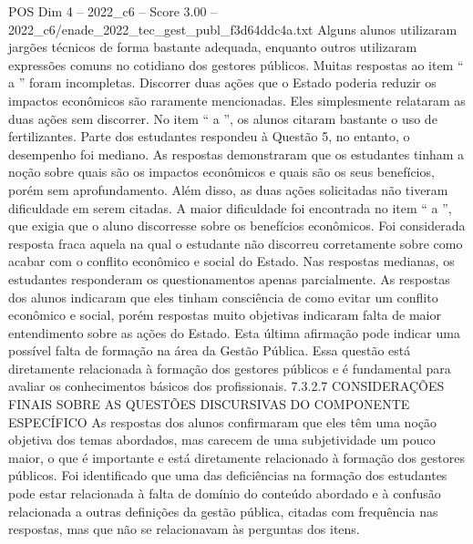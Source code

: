 \begin{textsample}{POS Dim 4 – 2022\_c6 – Score 3.00 – 2022\_c6/enade\_2022\_tec\_gest\_publ\_f3d64ddc4a.txt}
Alguns alunos utilizaram jargões técnicos de forma bastante adequada, enquanto outros utilizaram expressões comuns no cotidiano dos gestores públicos.
Muitas respostas ao item “ a ” foram incompletas.
Discorrer duas ações que o Estado poderia reduzir os impactos econômicos são raramente mencionadas.
Eles simplesmente relataram as duas ações sem discorrer.
No item “ a ”, os alunos citaram bastante o uso de fertilizantes.
Parte dos estudantes respondeu à Questão 5, no entanto, o desempenho foi mediano.
As respostas demonstraram que os estudantes tinham a noção sobre quais são os impactos econômicos e quais são os seus benefícios, porém sem aprofundamento.
Além disso, as duas ações solicitadas não tiveram dificuldade em serem citadas.
A maior dificuldade foi encontrada no item “ a ”, que exigia que o aluno discorresse sobre os benefícios econômicos.
Foi considerada resposta fraca aquela na qual o estudante não discorreu corretamente sobre como acabar com o conflito econômico e social do Estado.
Nas respostas medianas, os estudantes responderam os questionamentos apenas parcialmente.
As respostas dos alunos indicaram que eles tinham consciência de como evitar um conflito econômico e social, porém respostas muito objetivas indicaram falta de maior entendimento sobre as ações do Estado.
Esta última afirmação pode indicar uma possível falta de formação na área da Gestão Pública.
Essa questão está diretamente relacionada à formação dos gestores públicos e é fundamental para avaliar os conhecimentos básicos dos profissionais. 7.3.2.7 CONSIDERAÇÕES FINAIS SOBRE AS QUESTÕES DISCURSIVAS DO COMPONENTE ESPECÍFICO As respostas dos alunos confirmaram que eles têm uma noção objetiva dos temas abordados, mas carecem de uma subjetividade um pouco maior, o que é importante e está diretamente relacionado à formação dos gestores públicos.
Foi identificado que uma das deficiências na formação dos estudantes pode estar relacionada à falta de domínio do conteúdo abordado e à confusão relacionada a outras definições da gestão pública, citadas com frequência nas respostas, mas que não se relacionavam às perguntas dos itens.

\end{textsample}
